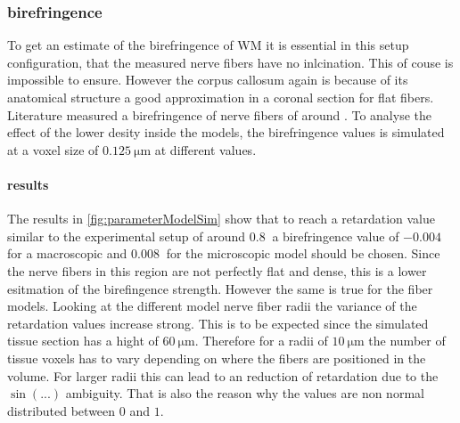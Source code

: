 \subsubsection{birefringence}
% 
To get an estimate of the birefringence of \ac{WM} it is essential in this setup configuration, that the measured nerve fibers have no inlcination.
This of couse is impossible to ensure.
However the corpus callosum again is because of its anatomical structure a good approximation in a coronal section for flat fibers.
Literature measured a birefringence of nerve fibers of around \dummy{}\TODO{!!!}. 
To analyse the effect of the lower desity inside the models, the birefringence values is simulated at a voxel size of $\SI{0.125}{\micro\meter}$ at different values.
% 
% 
\paragraph{results}
The results in \cref{fig:parameterModelSim} show that to reach a retardation value similar to the experimental setup of around $\SI{0.8}{}$ a birefringence value of $\SI{-0.004}{}$ for a macroscopic and $\SI{0.008}{}$ for the microscopic model should be chosen.
Since the nerve fibers in this region are not perfectly flat and dense, this is a lower esitmation of the birefingence strength.
However the same is true for the fiber models.
Looking at the different model nerve fiber radii the variance of the retardation values increase strong.
This is to be expected since the simulated tissue section has a hight of $\SI{60}{\micro\meter}$.
Therefore for a radii of $\SI{10}{\micro\meter}$ the number of tissue voxels has to vary depending on where the fibers are positioned in the volume.
For larger radii this can lead to an reduction of retardation due to the $\sin(...)$ ambiguity.
That is also the reason why the values are non normal distributed between $\si{0}$ and $\si{1}$.
%  
% 
% 
% 
% 
% 
